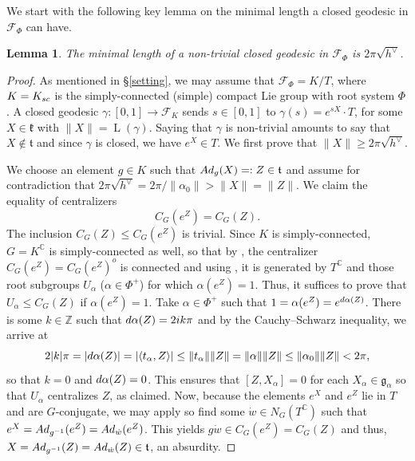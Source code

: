 \documentclass[11pt,twoside]{amsart}
\theoremstyle{plain}
\newtheorem{lem}[prop]{Lemma}
\newcommand{\C}{{\mathbb C}}
\newcommand{\Z}{{\mathbb Z}}
\DeclareMathOperator\leng{L}
\begin{document}
We start with the following key lemma on the minimal length a closed geodesic in $\mathcal{F}_\Phi$ can have.
\begin{lem}\label{mingeo}
The minimal length of a non-trivial closed geodesic in $\mathcal{F}_\Phi$ is $2\pi\sqrt{h^\vee}$.
\end{lem}

\begin{proof}
As mentioned in \S \ref{setting}, we may assume that $\mathcal{F}_\Phi=K/T$, where $K=K_{\rm sc}$ is the simply-connected (simple) compact Lie group with root system $\Phi$. A closed geodesic $\gamma : [0,1]\to\mathcal{F}_K$ sends $s\in[0,1]$ to $\gamma(s)=e^{sX}\cdot T$, for some $X\in\mathfrak{k}$ with $\|X\|=\leng(\gamma)$. Saying that $\gamma$ is non-trivial amounts to say that $X\notin\mathfrak{t}$ and  since $\gamma$ is closed, we have $e^X\in T$. We first prove that $\|X\|\ge2\pi\sqrt{h^\vee}$.

We choose an element $g\in K$ such that ${\rm Ad}_g(X)=:Z\in\mathfrak{t}$ and assume for contradiction that $2\pi\sqrt{h^\vee}=2\pi/\|\alpha_0\|>\|X\|=\|Z\|$. We claim the equality of centralizers
\[C_G(e^Z)=C_G(Z).\]
The inclusion $C_G(Z)\le C_G(e^Z)$ is trivial. Since $K$ is simply-connected, $G=K^\C$ is simply-connected as well, so that by \cite[Theorem 2.11]{hum_conj}, the centralizer $C_G(e^Z)=C_G(e^Z)^o$ is connected and using \cite[Theorem 2.2]{hum_conj}, it is generated by $T^\C$ and those root subgroups $U_\alpha$ ($\alpha\in\Phi^+$) for which $\alpha(e^Z)=1$. Thus, it suffices to prove that $U_\alpha\le C_G(Z)$ if $\alpha(e^Z)=1$. Take $\alpha\in\Phi^+$ such that $1=\alpha(e^Z)=e^{{\rm d}\alpha(Z)}$. There is some $k\in\Z$ such that ${\rm d}\alpha(Z)=2ik\pi$ and by the Cauchy--Schwarz inequality, we arrive at
\[2|k|\pi=|{\rm d}\alpha(Z)|=\left|\left<t_\alpha,Z\right>\right|\le\|t_\alpha\|\|Z\|=\|\alpha\|\|Z\|\le\|\alpha_0\|\|Z\|<2\pi,\]
so that $k=0$ and ${\rm d}\alpha(Z)=0$. This ensures that $[Z,X_\alpha]=0$ for each $X_\alpha\in\mathfrak{g}_\alpha$ so that $U_\alpha$ centralizes $Z$, as claimed. Now, because the elements $e^X$ and $e^Z$ lie in $T$ and are $G$-conjugate, we may apply \cite[Lemma 4.33]{adams_lie} so find some $\dot{w}\in N_G(T^\C)$ such that $e^X={\rm Ad}_{g^{-1}}(e^Z)={\rm Ad}_{\dot{w}}(e^Z)$. This yields $g\dot{w}\in C_G(e^Z)=C_G(Z)$ and thus, $X={\rm Ad}_{g^{-1}}(Z)={\rm Ad}_{\dot{w}}(Z)\in\mathfrak{t}$, an absurdity.


\end{proof}
\end{document}

